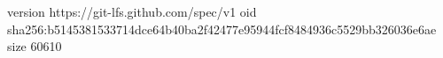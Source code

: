 version https://git-lfs.github.com/spec/v1
oid sha256:b5145381533714dce64b40ba2f42477e95944fcf8484936c5529bb326036e6ae
size 60610
